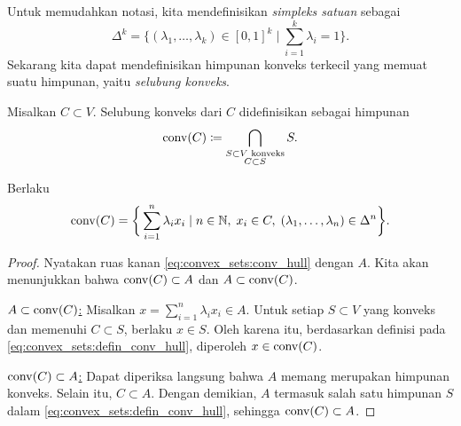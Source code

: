 Untuk memudahkan notasi, kita mendefinisikan \emph{simpleks satuan} sebagai
\begin{equation}
    \Delta^k = \{(\lambda_1,\dots,\lambda_k)\in [0,1]^k\;|\;\sum_{i=1}^k\lambda_i = 1\}.
\end{equation}
Sekarang kita dapat mendefinisikan himpunan konveks terkecil yang memuat suatu himpunan, yaitu \emph{selubung konveks}.

\begin{defn}
    Misalkan $C\subset V$. Selubung konveks dari $C$ didefinisikan sebagai himpunan
    \begin{equation}\label{eq:convex_sets:defin_conv_hull}
        \operatorname{\mathrm{conv}}(C) \coloneqq \bigcap_{\substack{S\subset V \text{ konveks}\\C\subset S}}S.
    \end{equation}
\end{defn}

\begin{lemma}
    Berlaku
    \begin{equation}\label{eq:convex_sets:conv_hull}
        \operatorname{\mathrm{conv}}(C) = \bigg\{ \sum_{i=1}^n\lambda_i x_i\;|\; n\in \mathbb{N},\;x_i\in C, \;
        (\lambda_1,\ldots,\lambda_n)\in \Delta^n\bigg\}.
    \end{equation}
\end{lemma}
\begin{proof}
    Nyatakan ruas kanan \eqref{eq:convex_sets:conv_hull} dengan $A$.
    Kita akan menunjukkan bahwa $\operatorname{\mathrm{conv}}(C)\subset A$ dan $A\subset\operatorname{\mathrm{conv}}(C)$.

    \underline{$A\subset\operatorname{\mathrm{conv}}(C)$:}
    Misalkan $x=\sum_{i=1}^n\lambda_i x_i\in A$. Untuk setiap $S\subset V$ yang konveks dan memenuhi $C\subset S$, berlaku $x\in S$. Oleh karena itu, berdasarkan definisi pada \eqref{eq:convex_sets:defin_conv_hull}, diperoleh $x\in\operatorname{\mathrm{conv}}(C)$.

    \underline{$\operatorname{\mathrm{conv}}(C)\subset A$:}
    Dapat diperiksa langsung bahwa $A$ memang merupakan himpunan konveks. Selain itu, $C\subset A$. Dengan demikian, $A$ termasuk salah satu himpunan $S$ dalam \eqref{eq:convex_sets:defin_conv_hull}, sehingga $\operatorname{\mathrm{conv}}(C)\subset A$.
\end{proof}

